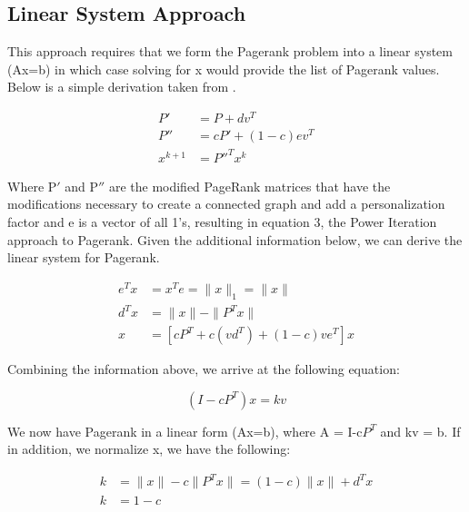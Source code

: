 \documentclass[letterpaper,12pt,onecolumn]{article}
\begin{document}
\subsection{Linear System Approach}
This approach requires that we form the Pagerank problem into a linear system (Ax=b) in which case solving for x would provide the list of Pagerank values. Below is a simple derivation taken from \cite{Fast Parallel}.
\begin{center}
\begin{align}
	P' &= P + dv^{T} \\
	P'' &= cP' + (1-c)ev^{T} \\
	x^{k+1} &= P''^{T}x^{k}
\end{align}

\end{center}
Where P$'$ and P$''$ are the modified PageRank matrices that have the modifications necessary to create a connected graph and add a personalization factor and e is a vector of all 1's, resulting in equation 3, the Power Iteration approach to Pagerank.
\newline
\linebreak
Given the additional information below, we can derive the linear system for Pagerank.


\begin{center}
\begin{align}
  e^{T}x & = x^{T}e = \|x\|_{1} = \|x\| \\
  d^{T}x &= \| x\| - \| P^{T}x\| \\
  x &= [cP^{T} + c(vd^{T}) + (1-c)ve^{T}]x
\end{align}
\end{center}

Combining the information above, we arrive at the following equation:

\begin{center}
\begin{equation}
  (I-cP^{T})x = kv
\end{equation}
\end{center}
We now have Pagerank in a linear form (Ax=b), where A = I-c$P^{T}$ and kv = b. If in addition, we normalize x, we have the following:

\begin{center}
  \begin{align}
	k &= \|x\| - c \|P^{T}x\| = (1-c) \|x\| + d^{T}x \\	
	k &= 1-c 
  \end{align}
\end{center}
\end{document}
